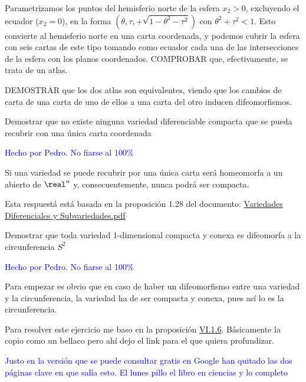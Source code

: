 \begin{problem}[3]
Parametrizamos los puntos del hemisferio norte de la esfera $x_2 > 0$,
excluyendo el ecuador ($x_2 = 0$), en la forma $(θ, τ, + \sqrt{1 − θ^2 − τ^2})$ con
$θ^2 + τ^2 < 1$. Esto convierte al hemisferio norte en una carta coordenada, y podemos cubrir la esfera con seis cartas de este tipo tomando
como ecuador cada una de las intersecciones de la esfera con los planos
coordenados. COMPROBAR que, efectivamente, se trata de un atlas.

DEMOSTRAR que los dos atlas son equivalentes, viendo que los cambios
de carta de una carta de uno de ellos a una carta del otro inducen difeomorfismos.

\solution
\end{problem}

\begin{problem}[4]
Demostrar que no existe ninguna variedad diferenciable compacta que se pueda recubrir con una única carta coordenada
\solution

\textcolor{blue}{Hecho por Pedro. No fiarse al 100\%}

Si una variedad se puede recubrir por una única carta será homeomorfa a un abierto de $\real^n$ y, consecuentemente, nunca podrá ser compacta.

Esta respuestá está basada en la proposición 1.28 del documento: \href{http://ocw.um.es/ciencias/geometria-y-topologia/material-de-clase-1/01-variedadesdiferenciablessubvariedades-v100901.pdf}{Variedades Diferenciales y Subvariedades.pdf}
\end{problem}

\begin{problem}[5]
Demostrar que toda variedad 1-dimensional compacta y conexa es difeomorfa a la circunferencia $S^2$
\solution

\textcolor{blue}{Hecho por Pedro. No fiarse al 100\%}

Para empezar es obvio que en caso de haber un difeomorfismo entre una variedad y la circunferencia, la variedad ha de ser compacta y conexa, pues así lo es la circunferencia.

Para resolver este ejercicio me baso en la proposición \href{https://books.google.es/books?id=CAOjRFAMJFUC&pg=PA131&lpg=PA131&dq=variedad+1-dimensional&source=bl&ots=MLkMP7HMyo&sig=aLLSSaYknqPZhPsn-5jJM2MwPAc&hl=es&sa=X&ei=DeMeVZSOEczZPdLkgfgJ&ved=0CCcQ6AEwAQ#v=onepage&q&f=false}{VI.1.6}. Básicamente la copio como un bellaco pero ahí dejo el link para el que quiera profundizar.

\textcolor{blue}{Justo en la versión que se puede consultar gratis en Google han quitado las dos páginas clave en que salía esto. El lunes pillo el libro en ciencias y lo completo}

\end{problem}

